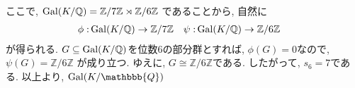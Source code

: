 \documentclass[dvipdfmx]{jsarticle}
\begin{document}
\begin{enumerate}
        ここで, $\operatorname{Gal}(K/\mathbb{Q}) = \mathbb{Z}/7\mathbb{Z}\rtimes\mathbb{Z}/6\mathbb{Z}$
        であることから,
        自然に
        \begin{align*}
            \phi: & \operatorname{Gal}(K/\mathbb{Q}) \to \mathbb{Z}/7\mathbb{Z} & \psi: & \operatorname{Gal}(K/\mathbb{Q}) \to \mathbb{Z}/6\mathbb{Z}
        \end{align*}
        が得られる.
        $G \subseteq \operatorname{Gal}(K/\mathbb{Q})$を位数$6$の部分群とすれば,
        $\phi(G) = 0$なので, $\psi(G) = \mathbb{Z}/6\mathbb{Z}$
        が成り立つ.
        ゆえに, $G \cong \mathbb{Z}/6\mathbb{Z}$である.
        したがって, $s_6 = 7$である.
    以上より, $\Gal(K/\mathbbb{Q})$
    \end{enumerate}
\end{document}
